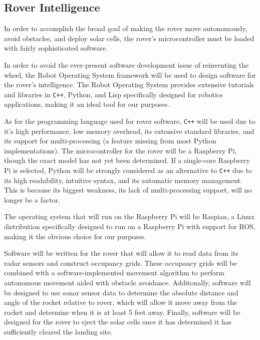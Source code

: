 \documentclass[onecolumn, draftclsnofoot,10pt, compsoc]{IEEEtran}
\begin{document}
\subsection{Rover Intelligence}
In order to accomplish the broad goal of making the rover move autonomously, avoid obstacles, and deploy solar cells, the rover's microcontroller must be loaded with fairly sophisticated software.
\par In order to avoid the ever-present software development issue of reinventing the wheel, the Robot Operating System framework will be used to design software for the rover's intelligence.
The Robot Operating System provides extensive tutorials and libraries in \verb!C++!, Python, and Lisp specifically designed for robotics applications, making it an ideal tool for our purposes.
\par As for the programming language used for rover software, \verb!C++! will be used due to it's high performance, low memory overhead, its extensive standard libraries, and its support for multi-processing (a feature missing from most Python implementations). 
The microcontroller for the rover will be a Raspberry Pi, though the exact model has not yet been determined.
If a single-core Raspberry Pi is selected, Python will be strongly considered as an alternative to \verb!C++! due to its high readability, intuitive syntax, and its automatic memory management.
This is because its biggest weakness, its lack of multi-processing support, will no longer be a factor.
\par The operating system that will run on the Raspberry Pi will be Raspian, a Linux distribution specifically designed to run on a Raspberry Pi with support for ROS, making it the obvious choice for our purposes.
\par Software will be written for the rover that will allow it to read data from its radar sensors and construct occupancy grids.
These occupancy grids will be combined with a software-implemented movement algorithm to perform autonomous movement aided with obstacle avoidance.
Additonally, software will be designed to use sonar sensor data to determine the absolute distance and angle of the rocket relative to rover, which will allow it move away from the rocket and determine when it is at least 5 feet away.
Finally, software will be designed for the rover to eject the solar cells once it has determined it has sufficiently cleared the landing site.
\end{document}
